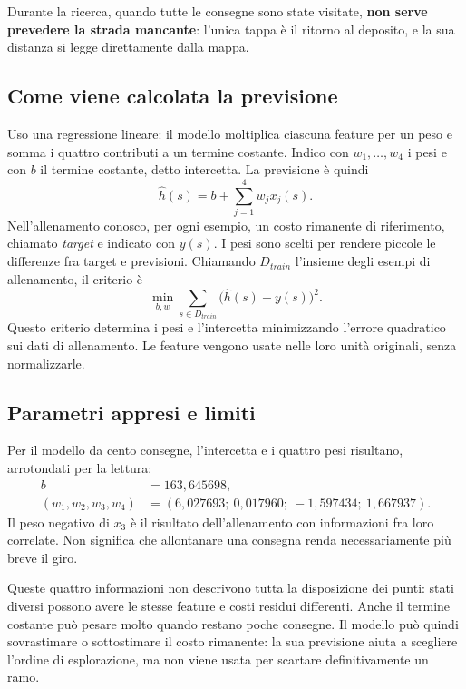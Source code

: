 Durante la ricerca, quando tutte le consegne sono state visitate,
\textbf{non serve prevedere la strada mancante}: l'unica tappa è il ritorno
al deposito, e la sua distanza si legge direttamente dalla mappa.

\subsection{Come viene calcolata la previsione}
Uso una regressione lineare: il modello moltiplica ciascuna feature per
un peso e somma i quattro contributi a un termine costante. Indico con
$w_1,\ldots,w_4$ i pesi e con $b$ il termine costante, detto intercetta.
La previsione è quindi
\[
 \widehat h(s)=b+\sum_{j=1}^{4}w_jx_j(s).
\]
Nell'allenamento conosco, per ogni esempio, un costo rimanente di riferimento,
chiamato \emph{target} e indicato con $y(s)$. I pesi sono scelti per rendere
piccole le differenze fra target e previsioni. Chiamando $D_{train}$
l'insieme degli esempi di allenamento, il criterio è
\[
 \min_{b,w}\sum_{s\in D_{train}}\bigl(\widehat h(s)-y(s)\bigr)^2.
\]
Questo criterio determina i pesi e l'intercetta minimizzando l'errore
quadratico sui dati di allenamento. Le feature vengono usate nelle loro
unità originali, senza normalizzarle.

\subsection{Parametri appresi e limiti}
Per il modello da cento consegne, l'intercetta e i quattro pesi risultano,
arrotondati per la lettura:
\[
\begin{split}
 b&=163{,}645698,\\
 (w_1,w_2,w_3,w_4)&=(6{,}027693;\ 0{,}017960;\ -1{,}597434;\ 1{,}667937).
\end{split}
\]
Il peso negativo di $x_3$ è il risultato dell'allenamento con informazioni
fra loro correlate. Non significa che allontanare una consegna renda
necessariamente più breve il giro.

Queste quattro informazioni non descrivono tutta la disposizione dei punti:
stati diversi possono avere le stesse feature e costi residui differenti.
Anche il termine costante può pesare molto quando restano poche consegne.
Il modello può quindi sovrastimare o sottostimare il costo rimanente:
la sua previsione aiuta a scegliere l'ordine di esplorazione, ma non viene
usata per scartare definitivamente un ramo.
